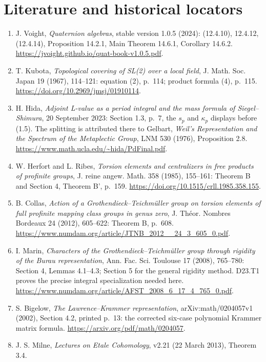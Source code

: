\documentclass[11pt]{article}
\begin{document}
\section{Literature and historical locators}
\small
\begin{enumerate}
\item J. Voight, \emph{Quaternion algebras}, stable version
1.0.5 (2024): (12.4.10), 12.4.12, (12.4.14), Proposition
14.2.1, Main Theorem 14.6.1, Corollary 14.6.2.
\url{https://jvoight.github.io/quat-book-v1.0.5.pdf}.
\item T. Kubota, \emph{Topological covering of SL(2) over a
local field}, J. Math. Soc. Japan 19 (1967), 114--121:
equation (2), p.~114; product formula (4), p.~115.
\url{https://doi.org/10.2969/jmsj/01910114}.
\item H. Hida, \emph{Adjoint L-value as a period integral and
the mass formula of Siegel--Shimura}, 20 September 2023:
Section 1.3, p.~7, the $s_p$ and $\kappa_p$ displays before
(1.5).  The splitting is attributed there to Gelbart,
\emph{Weil's Representation and the Spectrum of the
Metaplectic Group}, LNM 530 (1976), Proposition 2.8.
\url{https://www.math.ucla.edu/~hida/PdFinal.pdf}.
\item W. Herfort and L. Ribes, \emph{Torsion elements and
centralizers in free products of profinite groups}, J. reine
angew. Math. 358 (1985), 155--161: Theorem B and Section 4,
Theorem B', p.~159. \url{https://doi.org/10.1515/crll.1985.358.155}.
\item B. Collas, \emph{Action of a Grothendieck--Teichm\"uller
group on torsion elements of full profinite mapping class groups
in genus zero}, J. Th\'eor. Nombres Bordeaux 24 (2012),
605--622: Theorem B, p.~608.
\url{https://www.numdam.org/article/JTNB_2012__24_3_605_0.pdf}.
\item I. Marin, \emph{Characters of the Grothendieck--Teichm\"uller
group through rigidity of the Burau representation}, Ann. Fac.
Sci. Toulouse 17 (2008), 765--780: Section 4, Lemmas 4.1--4.3;
Section 5 for the general rigidity method.  D23.T1 proves the
precise integral specialization needed here.
\url{https://www.numdam.org/article/AFST_2008_6_17_4_765_0.pdf}.
\item S. Bigelow, \emph{The Lawrence--Krammer representation},
arXiv:math/0204057v1 (2002), Section 4.2, printed p.~13:
the corrected six-case polynomial Krammer matrix formula.
\url{https://arxiv.org/pdf/math/0204057}.
\item J. S. Milne, \emph{Lectures on Etale Cohomology}, v2.21
(22 March 2013), Theorem 3.4.

\end{enumerate}
\end{document}
